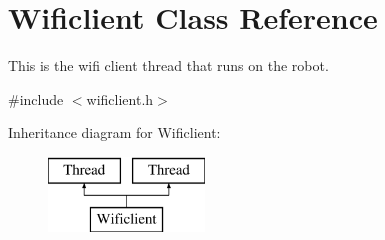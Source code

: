 \hypertarget{class_wificlient}{\section{Wificlient Class Reference}
\label{class_wificlient}
}


This is the wifi client thread that runs on the robot.  




{\ttfamily \#include $<$wificlient.\-h$>$}

Inheritance diagram for Wificlient\-:\begin{figure}[H]
\begin{center}
\leavevmode
\includegraphics[height=2.000000cm]{class_wificlient}
\end{center}
\end{figure}

